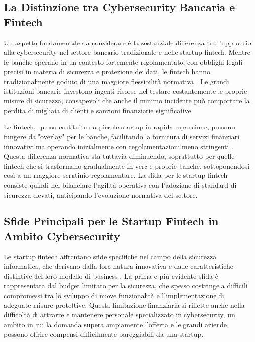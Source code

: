 \documentclass[a4paper,12pt]{report}
\begin{document}
\subsection{La Distinzione tra Cybersecurity Bancaria e Fintech}

Un aspetto fondamentale da considerare è la sostanziale differenza tra l'approccio alla cybersecurity nel settore bancario tradizionale e nelle startup fintech. Mentre le banche operano in un contesto fortemente regolamentato, con obblighi legali precisi in materia di sicurezza e protezione dei dati, le fintech hanno tradizionalmente goduto di una maggiore flessibilità normativa \cite{bankingVsFintech}. Le grandi istituzioni bancarie investono ingenti risorse nel testare costantemente le proprie misure di sicurezza, consapevoli che anche il minimo incidente può comportare la perdita di migliaia di clienti e sanzioni finanziarie significative.

Le fintech, spesso costituite da piccole startup in rapida espansione, possono fungere da "overlay" per le banche, facilitando la fornitura di servizi finanziari innovativi ma operando inizialmente con regolamentazioni meno stringenti \cite{bankingVsFintech}. Questa differenza normativa sta tuttavia diminuendo, soprattutto per quelle fintech che si trasformano gradualmente in vere e proprie banche, sottoponendosi così a un maggiore scrutinio regolamentare. La sfida per le startup fintech consiste quindi nel bilanciare l'agilità operativa con l'adozione di standard di sicurezza elevati, anticipando l'evoluzione normativa del settore.

\subsection{Sfide Principali per le Startup Fintech in Ambito Cybersecurity}

Le startup fintech affrontano sfide specifiche nel campo della sicurezza informatica, che derivano dalla loro natura innovativa e dalle caratteristiche distintive del loro modello di business \cite{fintechChallenges}. La prima e più evidente sfida è rappresentata dal budget limitato per la sicurezza, che spesso costringe a difficili compromessi tra lo sviluppo di nuove funzionalità e l'implementazione di adeguate misure protettive. Questa limitazione finanziaria si riflette anche nella difficoltà di attrarre e mantenere personale specializzato in cybersecurity, un ambito in cui la domanda supera ampiamente l'offerta e le grandi aziende possono offrire compensi difficilmente pareggiabili da una startup.
\end{document}
